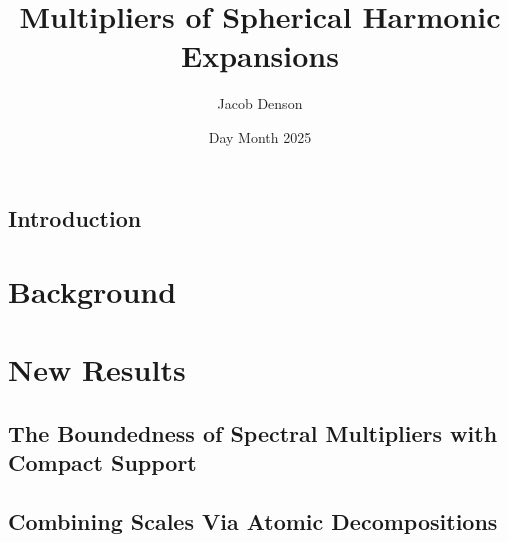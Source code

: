 \documentclass[12pt]{report}
\title{Multipliers of Spherical Harmonic Expansions}
\author{Jacob Denson}
\date{Day Month 2025}
\theoremstyle{plain}
\theoremstyle{remark}
\numberwithin{equation}{section}
\begin{document}












\tableofcontents




\chapter*{Introduction}



\part{Background}


%

\part{New Results}
\chapter{The Boundedness of Spectral Multipliers with Compact Support}


\chapter{Combining Scales Via Atomic Decompositions}


%

%

\singlespacing
\printbibliography
\end{document}

